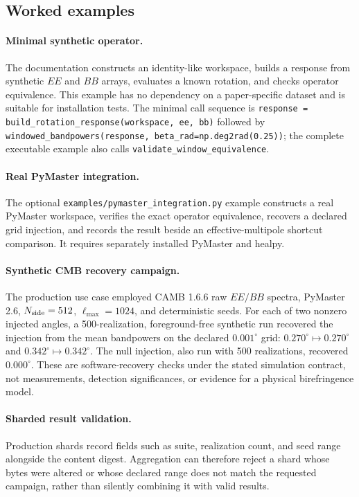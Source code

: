 \subsection*{Worked examples}

\paragraph{Minimal synthetic operator.}
The documentation constructs an identity-like workspace, builds a response
from synthetic \(EE\) and \(BB\) arrays, evaluates a known rotation, and checks
operator equivalence.  This example has no dependency on a paper-specific
dataset and is suitable for installation tests.
The minimal call sequence is
\texttt{response = build\_rotation\_response(workspace, ee, bb)} followed by
\texttt{windowed\_bandpowers(response, beta\_rad=np.deg2rad(0.25))}; the complete executable
example also calls \texttt{validate\_window\_equivalence}.

\paragraph{Real PyMaster integration.}
The optional \nolinkurl{examples/pymaster_integration.py} example constructs a
real PyMaster workspace, verifies the exact operator equivalence, recovers a
declared grid injection, and records the result beside an effective-multipole
shortcut comparison. It requires separately installed PyMaster and healpy.

\paragraph{Synthetic CMB recovery campaign.}
The production use case employed CAMB 1.6.6 raw \(EE/BB\) spectra, PyMaster
2.6, \(N_{\rm side}=512\), \(\ell_{\max}=1024\), and deterministic seeds.
For each of two nonzero injected angles, a 500-realization, foreground-free
synthetic run recovered the injection from the mean bandpowers on the declared
\(0.001^\circ\) grid: \(0.270^\circ\mapsto0.270^\circ\) and
\(0.342^\circ\mapsto0.342^\circ\).  The null injection, also run with 500
realizations, recovered \(0.000^\circ\).  These are software-recovery checks under the stated
simulation contract, not measurements, detection significances, or evidence
for a physical birefringence model.

\paragraph{Sharded result validation.}
Production shards record fields such as suite, realization count, and seed
range alongside the content digest.  Aggregation can therefore reject a shard
whose bytes were altered or whose declared range does not match the requested
campaign, rather than silently combining it with valid results.

